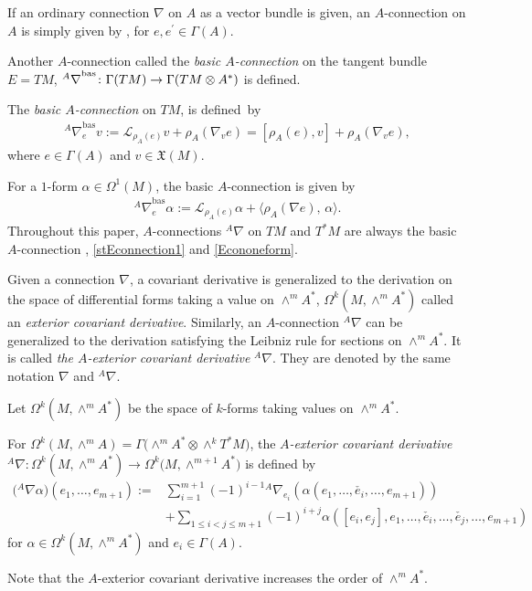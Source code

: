 \documentclass[10pt,a4paper]{amsart}
\numberwithin{equation}{section}
\newcommand{\calL}{{\mathcal L}}
\newcommand{\rhoa}{{\rho_A}}
\newcommand{\bracket}[2]{\langle #1,\,#2\rangle}
\newcommand{\nablabas}{{{}^A \nabla}^{\mathrm{bas}}}
\newcommand{\anabla}{{{}^A \nabla}}
\begin{document}
If an ordinary connection $\nabla$ on $A$ as a vector bundle is given,
an $A$-connection on $A$ is simply given by
\smash{$
 \anabla_{e} e^{\prime} := \nabla_{\rhoa(e^{\prime})} {e}$},
for $e, e^{\prime} \in \Gamma(A)$.

Another $A$-connection called the \textit{basic $A$-connection} on
the tangent bundle $E=TM$,
$\smash{\nablabas}\colon\allowbreak \Gamma(TM) \rightarrow \Gamma(TM \otimes A^*)$
is defined.
\begin{Definition}
The \textit{basic $A$-connection} on $TM$,
\smash{$\nablabas\colon \Gamma(TM) \rightarrow \Gamma(TM \otimes A^*)$}
is defined~by
\begin{gather}
\nablabas_{e} v := \calL_{\rhoa(e)} v + \rhoa(\nabla_v e)
= [\rhoa(e), v] + \rhoa(\nabla_v e),
\label{stEconnection1}
\end{gather}
where
$e \in \Gamma(A)$ and $v \in \mathfrak{X}(M)$.
\end{Definition}
For a $1$-form $\alpha \in \Omega^1(M)$, the basic $A$-connection
is given by
\begin{gather}
\nablabas_{e} \alpha := \calL_{\rhoa(e)} \alpha
+ \bracket{\rhoa(\nabla e)}{\alpha}.
\label{Econoneform}
\end{gather}
Throughout this paper, $A$-connections $\anabla$ on $TM$ and $T^*M$ are always
the basic $A$-connection \smash{$\anabla = \nablabas$},
\eqref{stEconnection1} and
\eqref{Econoneform}.

Given a connection $\nabla$, a covariant derivative is generalized
to the derivation on the space of differential forms taking a value on
$\wedge^m A^*$,
$\Omega^k(M, \wedge^m A^*)$ called an \textit{exterior covariant derivative}.
Similarly, an $A$-connection $\anabla$ can be generalized to the derivation
satisfying the Leibniz rule for sections on $\wedge^m A^*$.
It is called \textit{the $A$-exterior covariant derivative} $\anabla$.
They are denoted by the same notation $\nabla$ and ${}^A\nabla$.

Let $\Omega^k(M, \wedge^m A^*) $ be the space of $k$-forms taking values on
$\wedge^m A^*$.
\begin{Definition}
For $\Omega^k(M, \wedge^m A) = \Gamma\bigl(\wedge^m A^* \otimes \wedge^k T^*M\bigr)$,
the \textit{$A$-exterior covariant derivative}
$\anabla\colon \Omega^k(M, \wedge^m A^*) \rightarrow \Omega^k\bigl(M, \wedge^{m+1} A^*\bigr)$ is defined by
\begin{align*}%
\bigl(\anabla \alpha\bigr)(e_1, \ldots, e_{m+1})
:={}& \sum_{i=1}^{m+1} (-1)^{i-1}
\anabla_{e_i}
(\alpha(e_1, \ldots, \check{e_i}, \ldots, e_{m+1}))
\nonumber \\ &
+ \sum_{1 \leq i < j \leq m+1} (-1)^{i+j} \alpha([e_i, e_j], e_1, \ldots, \check{e_i}, \ldots, \check{e_j}, \ldots, e_{m+1})
\end{align*}
for $\alpha \in \Omega^k(M, \wedge^m A^*)$ and $e_i \in \Gamma(A)$.
\end{Definition}
Note that the $A$-exterior covariant derivative increases the order of $\wedge^m A^*$.
\end{document}
